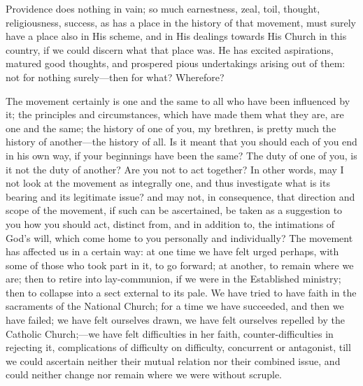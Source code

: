 Providence does nothing in vain; so much earnestness, zeal, toil,
thought, religiousness, success, as has a place in the history of that
movement, must surely have a place also in His scheme, and in His
dealings towards His Church in this country, if we could discern what
that place was. He has excited aspirations, matured good thoughts, and
prospered pious undertakings arising out of them: not for nothing
surely—then for what? Wherefore?

The movement certainly is one and the same to all who have been
influenced by it; the principles and circumstances, which have made
them what they are, are one and the same; the history of one of you,
my brethren, is pretty much the history of another—the history of
all. Is it meant that you should each of you end in his own way, if
your beginnings have been the same? The duty of one of you, is it not
the duty of another? Are you not to act together? In other words, may
I not look at the movement as integrally one, and thus investigate
what is its bearing and its legitimate issue? and may not, in
consequence, that direction and scope of the movement, if such can be
ascertained, be taken as a suggestion to you how you should act,
distinct from, and in addition to, the intimations of God's will,
which come home to you personally and individually? The movement has
affected us in a certain way: at one time we have felt urged perhaps,
with some of those who took part in it, to go forward; at another, to
remain where we are; then to retire into lay-communion, if we were in
the Established ministry; then to collapse into a sect external to its
pale. We have tried to have faith in the sacraments of the National
Church; for a time we have succeeded, and then we have failed; we have
felt ourselves drawn, we have felt ourselves repelled by the Catholic
Church;—we have felt difficulties in her faith, counter-difficulties
in rejecting it, complications of difficulty on difficulty, concurrent
or antagonist, till we could ascertain neither their mutual relation
nor their combined issue, and could neither change nor remain where we
were without scruple.

